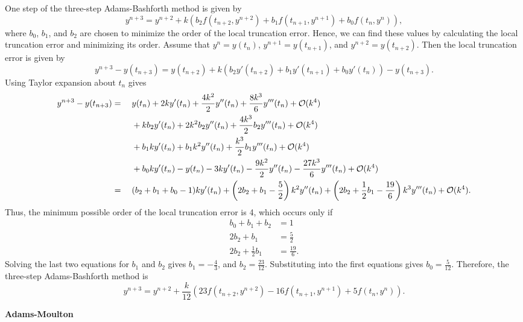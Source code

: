 \documentclass{homework}
\begin{document}
	One step of the three-step Adams-Bashforth method is given by
	\begin{equation*}
		y^{n+3} = y^{n+2} + k\left(b_2f(t_{n+2}, y^{n+2}) + b_1f(t_{n+1}, y^{n+1}) + b_0f(t_n, y^n)\right),
	\end{equation*}
	where $b_0$, $b_1$, and $b_2$ are chosen to minimize the order of the local truncation error. Hence, we can find these values by calculating the local truncation error and minimizing its order. Assume that $y^n = y(t_n)$, $y^{n+1} = y(t_{n+1})$, and $y^{n+2} = y(t_{n+2})$. Then the local truncation error is given by
	\begin{equation*}
		y^{n+3} - y(t_{n+3}) = y(t_{n+2}) + k\left(b_2y'(t_{n+2}) + b_1y'(t_{n+1}) + b_0y'(t_n)\right) - y(t_{n+3}).
	\end{equation*}
	Using Taylor expansion about $t_n$ gives
	\begin{alignat*}{2}
		y^{n+3} - y(t_{n+3}) &={}&  &y(t_n) + 2ky'(t_n) + \frac{4k^2}{2}y''(t_n) + \frac{8k^3}{6}y'''(t_n) + \mathcal{O}(k^4) \\
		&& & + kb_2y'(t_n) + 2k^2b_2y''(t_n) + \frac{4k^3}{2}b_2y'''(t_n) + \mathcal{O}(k^4) \\
		&&& + b_1ky'(t_n) + b_1k^2y''(t_n) + \frac{k^3}{2}b_1y'''(t_n) + \mathcal{O}(k^4) \\
		&&& + b_0ky'(t_n) - y(t_n) - 3ky'(t_n) - \frac{9k^2}{2}y''(t_n) - \frac{27k^3}{6}y'''(t_n) + \mathcal{O}(k^4) \\
		&={}&& (b_2 + b_1 + b_0 - 1)ky'(t_n) + \left(2b_2 + b_1 - \frac{5}{2}\right)k^2y''(t_n) + \left(2b_2+\frac{1}{2}b_1-\frac{19}{6}\right)k^3y'''(t_n) + \mathcal{O}(k^4).
	\end{alignat*}
	Thus, the minimum possible order of the local truncation error is 4, which occurs only if
	\begin{align*}
		b_0 + b_1 + b_2 &= 1 \\
		2b_2 + b_1 &= \frac{5}{2} \\
		2b_2 + \frac{1}{2}b_1 &= \frac{19}{6}.
	\end{align*}
	Solving the last two equations for $b_1$ and $b_2$ gives $b_1 = -\frac{4}{3}$, and $b_2 = \frac{23}{12}$. Substituting into the first equations gives $b_0 = \frac{5}{12}$. Therefore, the three-step Adams-Bashforth method is
	\begin{equation*}
		y^{n+3} = y^{n+2} + \frac{k}{12}\left(23f(t_{n+2}, y^{n+2}) - 16f(t_{n+1}, y^{n+1}) + 5f(t_n,y^n)\right).
	\end{equation*}
	
	\textbf{Adams-Moulton}
	
\end{document}
